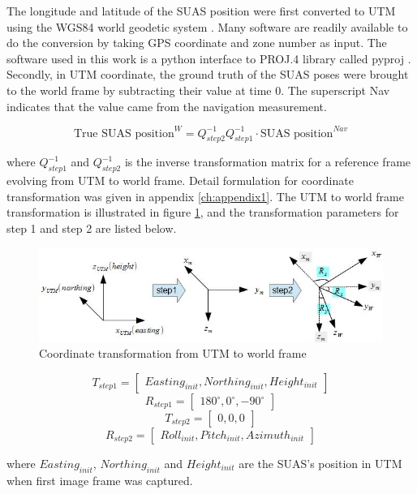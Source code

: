 The longitude and latitude of the SUAS position were first converted
to UTM using the WGS84 world geodetic system \cite{_world_????}. Many
software are readily available to do the conversion by taking GPS
coordinate and zone number as input. The software used in this work is
a python interface to PROJ.4 library \cite{_pyproj_????} called pyproj
\cite{_pyproj_????}. Secondly, in UTM coordinate, the ground truth of
the SUAS poses were brought to the world frame by subtracting their
value at time 0. The superscript Nav indicates that the value came
from the navigation measurement.

$$\text{True SUAS position}^W = 
Q_{step2}^{-1}Q_{step1}^{-1} \cdot\text{SUAS position}^{Nav}$$

\noindent where $Q_{step1}^{-1}$ and $Q_{step2}^{-1}$ is the inverse
transformation matrix for a reference frame evolving from UTM to world
frame. Detail formulation for coordinate transformation was given in
appendix \ref{ch:appendix1}. The UTM to world frame transformation is
illustrated in figure \ref{fig:utm_to_world}, and the transformation
parameters for step 1 and step 2 are listed below.

\begin{figure}[h]
  \centering
  \includegraphics[width=12cm,keepaspectratio=true]{./Figures/utm_to_world.jpg}
  \caption{Coordinate transformation from UTM to world frame}
  \label{fig:utm_to_world}
\end{figure}

$$T_{step1} = \begin{bmatrix}Easting_{init}, Northing_{init},
  Height_{init}\end{bmatrix}$$
$$R_{step1} = \begin{bmatrix}180^{\circ}, 0^{\circ},
  -90^{\circ}\end{bmatrix}$$
$$T_{step2} = \begin{bmatrix}0, 0, 0\end{bmatrix}$$
$$R_{step2} = \begin{bmatrix}Roll_{init}, Pitch_{init},
  Azimuth_{init}\end{bmatrix}$$

\noindent where $Easting_{init}$, $Northing_{init}$ and
$Height_{init}$ are the SUAS's position in UTM when first image frame
was captured. 

